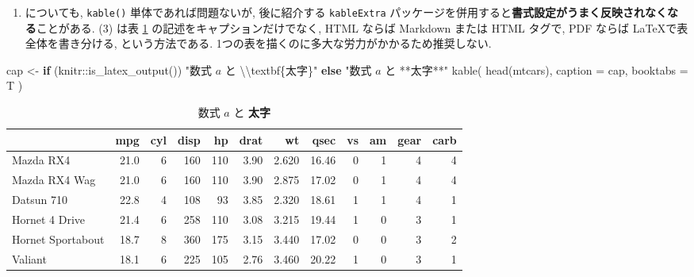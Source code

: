 \documentclass[
]{bxjsbook}
\newenvironment{Shaded}{\begin{snugshade}}{\end{snugshade}}
\newcommand{\AttributeTok}[1]{\textcolor[rgb]{0.77,0.63,0.00}{#1}}
\newcommand{\ControlFlowTok}[1]{\textcolor[rgb]{0.13,0.29,0.53}{\textbf{#1}}}
\newcommand{\FunctionTok}[1]{\textcolor[rgb]{0.00,0.00,0.00}{#1}}
\newcommand{\NormalTok}[1]{#1}
\newcommand{\OtherTok}[1]{\textcolor[rgb]{0.56,0.35,0.01}{#1}}
\newcommand{\SpecialCharTok}[1]{\textcolor[rgb]{0.00,0.00,0.00}{#1}}
\newcommand{\StringTok}[1]{\textcolor[rgb]{0.31,0.60,0.02}{#1}}
\providecommand{\tightlist}{%
  \setlength{\itemsep}{0pt}\setlength{\parskip}{0pt}}
\theoremstyle{definition}
\theoremstyle{definition}
\theoremstyle{definition}
\theoremstyle{remark}
\begin{document}
\begin{enumerate}
\def\labelenumi{(\arabic{enumi})}
\setcounter{enumi}{1}
\tightlist
\item
  についても, \texttt{kable()} 単体であれば問題ないが, 後に紹介する
  \texttt{kableExtra}
  パッケージを併用すると\textbf{書式設定がうまく反映されなくなる}ことがある.
  (3) は表 \ref{tab:kable-caption-example}
  の記述をキャプションだけでなく, HTML ならば Markdown または HTML
  タグで, PDF ならば \LaTeX で表全体を書き分ける, という方法である.
  1つの表を描くのに多大な労力がかかるため推奨しない.
\end{enumerate}

\begin{Shaded}
\begin{Highlighting}[numbers=left,,]
\NormalTok{cap }\OtherTok{\textless{}{-}} \ControlFlowTok{if}\NormalTok{ (knitr}\SpecialCharTok{::}\FunctionTok{is\_latex\_output}\NormalTok{()) }\StringTok{"数式 $a$ と }\SpecialCharTok{\textbackslash{}\textbackslash{}}\StringTok{textbf\{太字\}"} \ControlFlowTok{else} \StringTok{"数式 $a$ と **太字**"}
\FunctionTok{kable}\NormalTok{(}
  \FunctionTok{head}\NormalTok{(mtcars),}
  \AttributeTok{caption =}\NormalTok{ cap,}
  \AttributeTok{booktabs =}\NormalTok{ T}
\NormalTok{)}
\end{Highlighting}
\end{Shaded}

\begin{table}

\caption{\label{tab:kable-caption-example}数式 $a$ と \textbf{太字}}
\centering
\begin{tabular}[t]{lrrrrrrrrrrr}
\toprule
  & mpg & cyl & disp & hp & drat & wt & qsec & vs & am & gear & carb\\
\midrule
Mazda RX4 & 21.0 & 6 & 160 & 110 & 3.90 & 2.620 & 16.46 & 0 & 1 & 4 & 4\\
Mazda RX4 Wag & 21.0 & 6 & 160 & 110 & 3.90 & 2.875 & 17.02 & 0 & 1 & 4 & 4\\
Datsun 710 & 22.8 & 4 & 108 & 93 & 3.85 & 2.320 & 18.61 & 1 & 1 & 4 & 1\\
Hornet 4 Drive & 21.4 & 6 & 258 & 110 & 3.08 & 3.215 & 19.44 & 1 & 0 & 3 & 1\\
Hornet Sportabout & 18.7 & 8 & 360 & 175 & 3.15 & 3.440 & 17.02 & 0 & 0 & 3 & 2\\
\addlinespace
Valiant & 18.1 & 6 & 225 & 105 & 2.76 & 3.460 & 20.22 & 1 & 0 & 3 & 1\\
\bottomrule
\end{tabular}
\end{table}
\end{document}

